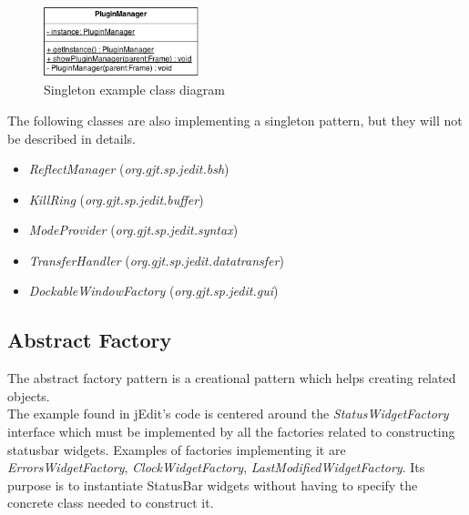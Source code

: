 \begin{figure}[h!]
    \includegraphics[width=0.4\textwidth]{images/singleton.png}
    \centering
    \caption{Singleton example class diagram}
\end{figure}

\begin{framehint}
    The following classes are also implementing a singleton pattern, but they
    will not be described in details.

    \begin{itemize}\itemsep1pt
        \item \emph{ReflectManager} (\emph{org.gjt.sp.jedit.bsh})
        \item \emph{KillRing} (\emph{org.gjt.sp.jedit.buffer})
        \item \emph{ModeProvider} (\emph{org.gjt.sp.jedit.syntax})
        \item \emph{TransferHandler} (\emph{org.gjt.sp.jedit.datatransfer})
        \item \emph{DockableWindowFactory} (\emph{org.gjt.sp.jedit.gui})
    \end{itemize}
\end{framehint}
\newpage

\subsection{Abstract Factory}
\noindent The abstract factory pattern is a creational pattern which helps creating
related objects.\\

The example found in jEdit's code is centered around the
\emph{StatusWidgetFactory} interface which must be implemented by all the
factories related to constructing statusbar widgets. Examples of factories
implementing it are \emph{ErrorsWidgetFactory}, \emph{ClockWidgetFactory},
\emph{LastModifiedWidgetFactory}. Its purpose is to instantiate StatusBar
widgets without having to specify the concrete class needed to construct it.

